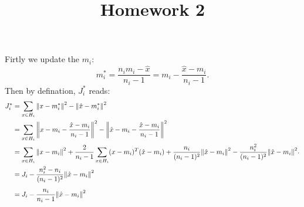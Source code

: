 \documentclass{article}
\begin{document}
\title{Homework 2}
\maketitle
Firtly we update the $m_i$:
\[
	m_i^*=\frac{n_im_i-\hat{x}}{n_i-1}=m_i-\frac{\hat{x}-m_i}{n_i-1}
.\] 
Then by defination, $J_i^*$ reads:
\[
	\begin{aligned}
		J^*_i
		&=
		\sum_{x\in H_i} \norm{x-m_i^*}^2 - \norm{\hat{x}-m_i^*}^2
		\\&=
		\sum_{x\in H_i} \norm{x-m_i-\frac{\hat{x}-m_i}{n_i-1}}^2
		- 
		\norm{\hat{x}-m_i-\frac{\hat{x}-m_i}{n_i-1}}^2
		\\&=
		\sum_{x\in H_i} \norm{x-m_i}^2
		+
		\frac{2}{n_i-1}\sum_{x\in H_i}(x-m_i)^T(\hat{x}-m_i)
		+
		\frac{n_i}{(n_i-1)^2}\norm{\hat{x}-m_i}^2
		-
		\frac{n_i^2}{(n_i-1)^2}\norm{\hat{x}-m_i}^2
		\\&=
		J_i
		-
		\frac{n_i^2-n_i}{(n_i-1)^2}\norm{\hat{x}-m_i}^2
		\\[5pt]&=
		J_i
		-
		\frac{n_i}{n_i-1}\norm{\hat{x}-m_i}^2
	\end{aligned}
.\] 
\end{document}

